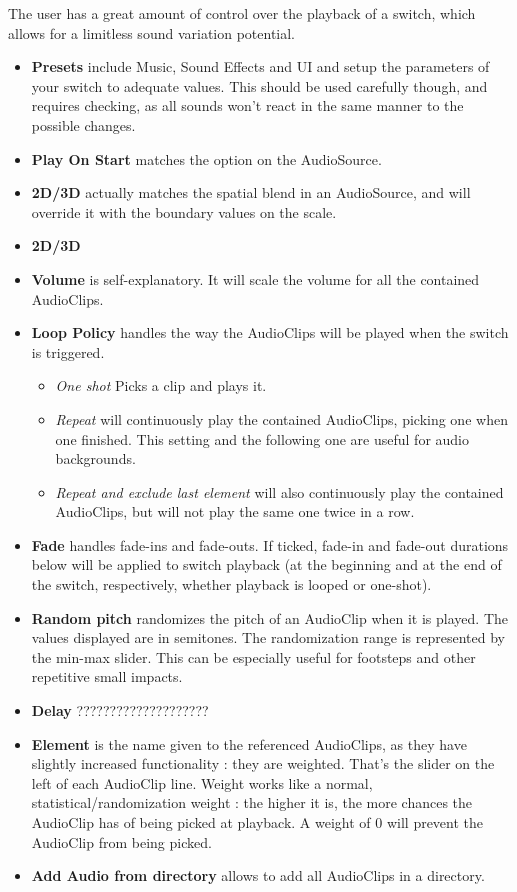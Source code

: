 \documentclass[a4paper,10pt]{article}
\begin{document}
The user has a great amount of control over the playback of a switch, which allows for a limitless sound variation potential. \begin{itemize}
\item \textbf{Presets} include Music, Sound Effects and UI and setup the parameters of your switch to adequate values. This should be used carefully though, and requires checking, as all sounds won't react in the same manner to the possible changes.
\item \textbf{Play On Start} matches the option on the AudioSource.
\item \textbf{2D/3D} actually matches the spatial blend in an AudioSource, and will override it with the boundary values on the scale.
\item \textbf{2D/3D}
\item \textbf{Volume} is self-explanatory. It will scale the volume for all the contained AudioClips.
\item \textbf{Loop Policy} handles the way the AudioClips will be played when the switch is triggered. 
	\begin{itemize}
	\item \emph{One shot} Picks a clip and plays it.
	\item \emph{Repeat} will continuously play the contained AudioClips, picking one when one finished. This setting and the following one are useful for audio backgrounds.
	\item \emph{Repeat and exclude last element} will also continuously play the contained AudioClips, but will not play the same one twice in a row.
	\end{itemize}

\item \textbf{Fade} handles fade-ins and fade-outs. If ticked, fade-in and fade-out durations below will be applied to switch playback (at the beginning and at the end of the switch, respectively, whether playback is looped or one-shot).
\item \textbf{Random pitch} randomizes the pitch of an AudioClip when it is played. The values displayed are in semitones. The randomization range is represented by the min-max slider. This can be especially useful for footsteps and other repetitive small impacts.
\item \textbf{Delay} ????????????????????
\item \textbf{Element} is the name given to the referenced AudioClips, as they have slightly increased functionality : they are weighted. That's the slider on the left of each AudioClip line. Weight works like a normal, statistical/randomization weight : the higher it is, the more chances the AudioClip has of being picked at playback. A weight of 0 will prevent the AudioClip from being picked.
\item \textbf{Add Audio from directory} allows to add all AudioClips in a directory.
\end{itemize}
\end{document}
